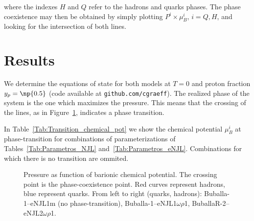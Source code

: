 \documentclass[plainsections,a0]{sciposterlocal}
\begin{document}
\begin{multicols}{2}
\noindent{}where the indexes $H$ and $Q$ refer to the hadrons and quarks phases. The phase coexistence may then be obtained by simply plotting $P^i \times \mu_B^i$, $i = Q, H$, and looking for the intersection of both lines.

\section*{Results}

We determine the equations of state for both models at $T = 0$ and proton fraction $y_p = \np{0.5}$ (code available at \texttt{github.com/cgraeff}). The realized phase of the system is the one which maximizes the pressure. This means that the crossing of the lines, as in Figure~\ref{Fig:Pressure_func_chemical_pot}, indicates a phase transition.

In Table~\ref{Tab:Transition_chemical_pot} we show the chemical potential $\mu_B^i$ at phase-transition for combinations of parameterizations of Tables~\ref{Tab:Parametros_NJL} and~\ref{Tab:Parametros_eNJL}. Combinations for which there is no transition are ommited.

\begin{figure}
\caption{Pressure as function of barionic chemical potential. The crossing point is the phase-coexistence point. Red curves represent hadrons, blue represent quarks. From left to right (quarks, hadrons): Buballa-1--eNJL1m (no phase-transition), Buballa-1--eNJL1$\omega\rho$1, BuballaR-2--eNJL2$\omega\rho$1.\label{Fig:Pressure_func_chemical_pot}}

\end{figure}


\end{multicols}
\end{document}
